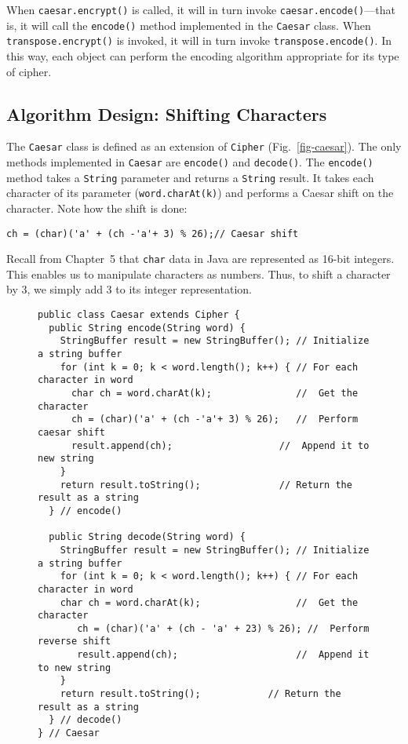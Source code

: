 \noindent When {\tt caesar.encrypt()} is called, it will in turn
invoke {\tt caesar.en\-code()}---that is, it will call the
{\tt encode()} method implemented in the {\tt Caesar} class.  When
{\tt transpose.encrypt()} is invoked, it will in turn invoke
{\tt trans\-pose.encode()}. In this way, each object can perform the encoding
algorithm appropriate for its type of 
cipher.

\subsection{Algorithm Design: Shifting Characters}
\noindent The {\tt Caesar} class is defined as an extension of {\tt Cipher}
(Fig.~\ref{fig-caesar}). The only methods implemented in {\tt Caesar}
are {\tt encode()} and {\tt decode()}. The {\tt encode()} method takes
a {\tt String} parameter and returns a {\tt String} result.  It takes
each character of its parameter ({\tt word.charAt(k)}) and performs a
Caesar shift on the character.  Note how the shift is done:

\begin{jjjlisting}
\begin{lstlisting}
ch = (char)('a' + (ch -'a'+ 3) % 26);// Caesar shift
\end{lstlisting}
\end{jjjlisting}

\noindent Recall from Chapter~5 that {\tt char} data in Java are
represented as 16-bit integers.  This enables us to manipulate
characters as numbers.  Thus, to shift a character by 3, we simply add
3 to its integer representation.

\begin{figure}[h]
\jjjprogstart
\begin{jjjlisting}[35pc]
\begin{lstlisting}
public class Caesar extends Cipher {
  public String encode(String word) {
    StringBuffer result = new StringBuffer(); // Initialize a string buffer
    for (int k = 0; k < word.length(); k++) { // For each character in word
      char ch = word.charAt(k);               //  Get the character
      ch = (char)('a' + (ch -'a'+ 3) % 26);   //  Perform caesar shift
      result.append(ch);                   //  Append it to new string
    }
    return result.toString();              // Return the result as a string
  } // encode()

  public String decode(String word) {
    StringBuffer result = new StringBuffer(); // Initialize a string buffer
    for (int k = 0; k < word.length(); k++) { // For each character in word
    char ch = word.charAt(k);                 //  Get the character
       ch = (char)('a' + (ch - 'a' + 23) % 26); //  Perform reverse shift
       result.append(ch);                     //  Append it to new string
    }
    return result.toString();            // Return the result as a string
  } // decode()
} // Caesar
\end{lstlisting}
\end{jjjlisting}
\end{figure}

